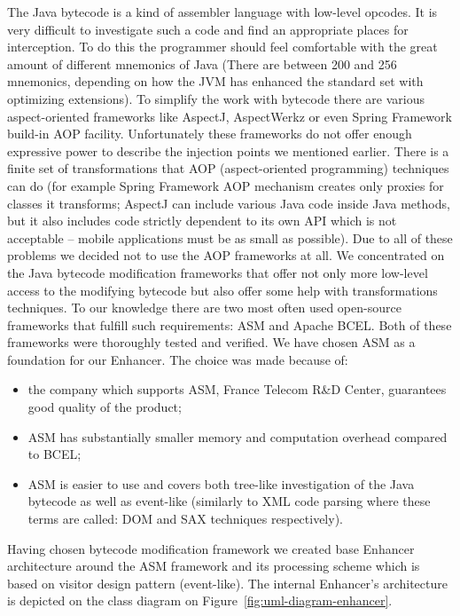 The Java bytecode is a kind of assembler language with low-level opcodes. It is very difficult to investigate
such a code and find an appropriate places for interception. To do this the programmer
should feel comfortable with the great amount of different mnemonics of Java (There are between
200 and 256 mnemonics, depending on how the JVM has enhanced the standard
set with optimizing extensions). 
To simplify the work with bytecode there are various
aspect-oriented frameworks like AspectJ, AspectWerkz 
or even Spring Framework build-in AOP facility. Unfortunately these frameworks do not offer enough
expressive power to describe the injection points we mentioned earlier.
There is a finite set of transformations that AOP (aspect-oriented programming)
techniques can do (for example Spring Framework AOP mechanism creates only
proxies for classes it transforms; AspectJ can include various Java code inside Java methods,
but it also includes code strictly dependent to its own API which is not acceptable
-- mobile applications must be as small as possible). Due to all of these problems
we decided not to use the AOP frameworks at all. We concentrated on the Java bytecode modification
frameworks that offer not only more low-level access to the modifying bytecode but also offer
some help with transformations techniques. To our knowledge there are two most often
used open-source frameworks that fulfill such requirements: ASM and Apache
BCEL. Both of these frameworks were thoroughly
tested and verified. We have chosen ASM as a foundation for our Enhancer.
The choice was made because of:
\begin{itemize}
\item the company which supports ASM, France Telecom R\&D Center, guarantees good quality of the product;
\item ASM has substantially smaller memory and computation overhead compared to BCEL;
\item ASM is easier to use and covers both tree-like investigation of the Java bytecode as well as
  event-like (similarly to XML code parsing where these terms are called: DOM and SAX techniques respectively).
\end{itemize}

Having chosen bytecode modification framework we created base Enhancer architecture around the ASM
framework and its processing scheme which is based on visitor design pattern (event-like). The internal 
Enhancer's architecture is depicted on the class diagram on Figure~\ref{fig:uml-diagram-enhancer}.

